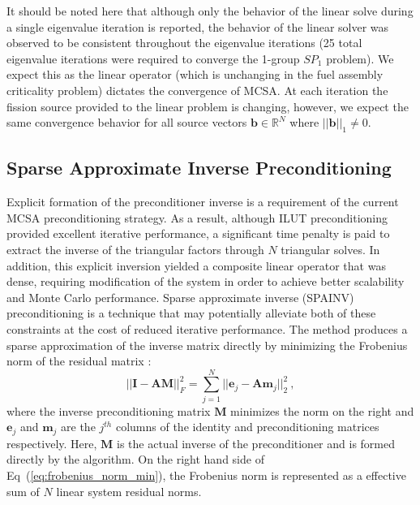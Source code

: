 It should be noted here that although only the behavior of the linear
solve during a single eigenvalue iteration is reported, the behavior
of the linear solver was observed to be consistent throughout the
eigenvalue iterations (25 total eigenvalue iterations were required to
converge the 1-group $SP_1$ problem). We expect this as the linear
operator (which is unchanging in the fuel assembly criticality
problem) dictates the convergence of MCSA. At each iteration the
fission source provided to the linear problem is changing, however, we
expect the same convergence behavior for all source vectors
$\mathbf{b} \in \mathbb{R}^{N}$ where $||\mathbf{b}||_1 \neq 0$.

\subsection{Sparse Approximate Inverse Preconditioning}
\label{subsec:spn_spainv_preconditioning}
Explicit formation of the preconditioner inverse is a requirement of
the current MCSA preconditioning strategy. As a result, although ILUT
preconditioning provided excellent iterative performance, a
significant time penalty is paid to extract the inverse of the
triangular factors through $N$ triangular solves. In addition, this
explicit inversion yielded a composite linear operator that was dense,
requiring modification of the system in order to achieve better
scalability and Monte Carlo performance. Sparse approximate inverse
(SPAINV) preconditioning is a technique that may potentially alleviate
both of these constraints at the cost of reduced iterative
performance. The method produces a sparse approximation of the inverse
matrix directly by minimizing the Frobenius norm of the residual
matrix \cite{saad_iterative_2003}:
\begin{equation}
  || \mathbf{I} - \mathbf{A} \mathbf{M} ||^2_F =
  \sum_{j=1}^N ||\mathbf{e}_j - \mathbf{A} \mathbf{m}_j||^2_2 \:,
  \label{eq:frobenius_norm_min}
\end{equation}
where the inverse preconditioning matrix $\mathbf{M}$ minimizes the
norm on the right and $\mathbf{e}_j$ and $\mathbf{m}_j$ are the
$j^{th}$ columns of the identity and preconditioning matrices
respectively. Here, $\mathbf{M}$ is the actual inverse of the
preconditioner and is formed directly by the algorithm. On the right
hand side of Eq~(\ref{eq:frobenius_norm_min}), the Frobenius norm is
represented as a effective sum of $N$ linear system residual norms. 


